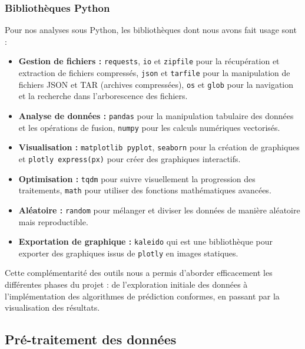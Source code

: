 \documentclass[a4paper,12pt]{article}
\begin{document}
\subsubsection{Bibliothèques Python}

Pour nos analyses sous Python, les bibliothèques dont nous avons fait usage sont :
\begin{itemize}
    \item \textbf{Gestion de fichiers :} \texttt{requests}, \texttt{io}  et \texttt{zipfile} pour la récupération et extraction de fichiers compressés, \texttt{json} et \texttt{tarfile} pour la manipulation de fichiers JSON et TAR (archives compressées), \texttt{os} et \texttt{glob} pour la navigation et la recherche dans l'arborescence des fichiers.
    \item \textbf{Analyse de données :} \texttt{pandas} pour la manipulation tabulaire des données et les opérations de fusion, \texttt{numpy} pour les calculs numériques vectorisés.
    \item \textbf{Visualisation :} \texttt{matplotlib pyplot}, \texttt{seaborn} pour la création de graphiques et \texttt{plotly express(px)} pour créer des graphiques interactifs.
    \item \textbf{Optimisation :} \texttt{tqdm} pour suivre visuellement la progression des traitements, \texttt{math} pour utiliser des fonctions mathématiques avancées.
    \item \textbf{Aléatoire :} \texttt{random} pour mélanger et diviser les données de manière aléatoire mais reproductible.
    \item \textbf{Exportation de graphique :} \texttt{kaleido} qui est une bibliothèque pour exporter des graphiques issus de \texttt{plotly} en images statiques.
\end{itemize}

\vspace{0.2cm}

Cette complémentarité des outils nous a permis d'aborder efficacement les différentes phases du projet : de l'exploration initiale des données à l'implémentation des algorithmes de prédiction conformes, en passant par la visualisation des résultats.


\subsection{Pré-traitement des données}
\end{document}
